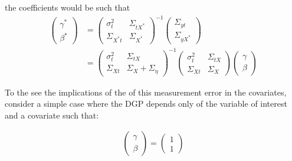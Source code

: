 \documentclass[12pt]{article}
\begin{document}
        the coefficients would be such that
        \begin{align}
            \left(\begin{array}{l}
        {\gamma}^* \\
        {\beta}^*
        \end{array}\right)&=\left(\begin{array}{cc}
        {\sigma}^2_{t} & \Sigma_{tX^*} \\
        \Sigma_{X^*t} & {\Sigma}_{X^*}
        \end{array}\right)^{-1}\left(\begin{array}{c}
        \Sigma_{yt} \\
        \Sigma_{yX^*}
        \end{array}\right) \\
        & =\left(\begin{array}{cc}
        {\sigma}^2_{t} & \Sigma_{tX} \\
        \Sigma_{Xt} & {\Sigma}_{X}+{\Sigma}_{\eta}
        \end{array}\right)^{-1}\left(\begin{array}{cc}
        {\sigma}^2_{t} & \Sigma_{tX} \\
        \Sigma_{Xt} & {\Sigma}_{X}
        \end{array}\right)\left(\begin{array}{l}
        {\gamma} \\
        {\beta}
        \end{array}\right)
        \end{align}

        To the see the implications of the of this measurement error in the covariates, consider a simple case where the DGP depends only of the variable of interest and a covariate such that:

        \begin{align}
            \left(\begin{array}{l}
        {\gamma} \\
        {\beta}
        \end{array}\right)=\left(\begin{array}{l}
        1 \\
        1
        \end{array}\right)
        \end{align}
\end{document}
